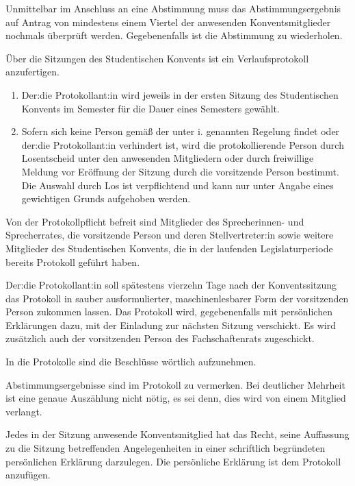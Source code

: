 \documentclass[10pt,a4paper]{scrartcl}
\begin{document}
\begin{contract}
Unmittelbar im Anschluss an eine Abstimmung muss das
Abstimmungsergebnis auf Antrag von mindestens einem Viertel der
anwesenden Konventsmitglieder nochmals überprüft werden.
Gegebenenfalls ist die Abstimmung zu wiederholen.



\label{protokoll}

Über die Sitzungen des Studentischen Konvents ist ein
Verlaufsprotokoll anzufertigen.


\begin{enumerate}
\item
  Der:die Protokollant:in wird jeweils in der ersten Sitzung des
  Studentischen Konvents im Semester für die Dauer eines Semesters
  gewählt.
\item
  Sofern sich keine Person gemäß der unter i. genannten Regelung findet
  oder der:die Protokollant:in verhindert ist, wird die protokollierende
  Person durch Losentscheid unter den anwesenden Mitgliedern oder durch
  freiwillige Meldung vor Eröffnung der Sitzung durch die vorsitzende
  Person bestimmt. Die Auswahl durch Los ist verpflichtend und kann nur
  unter Angabe eines gewichtigen Grunds aufgehoben werden.
\end{enumerate}

Von der Protokollpflicht befreit sind Mitglieder des Sprecherinnen-
und Sprecherrates, die vorsitzende Person und deren Stellvertreter:in
sowie weitere Mitglieder des Studentischen Konvents, die in der
laufenden Legislaturperiode bereits Protokoll geführt haben.

Der:die Protokollant:in soll spätestens vierzehn Tage nach der
Konventssitzung das Protokoll in sauber ausformulierter,
maschinenlesbarer Form der vorsitzenden Person zukommen lassen. Das
Protokoll wird, gegebenenfalls mit persönlichen Erklärungen dazu, mit
der Einladung zur nächsten Sitzung verschickt. Es wird zusätzlich auch
der vorsitzenden Person des Fachschaftenrats zugeschickt.

In die Protokolle sind die Beschlüsse wörtlich aufzunehmen.

Abstimmungsergebnisse sind im Protokoll zu vermerken. Bei deutlicher
Mehrheit ist eine genaue Auszählung nicht nötig, es sei denn, dies
wird von einem Mitglied verlangt.

Jedes in der Sitzung anwesende Konventsmitglied hat das Recht, seine
Auffassung zu die Sitzung betreffenden Angelegenheiten in einer
schriftlich begründeten persönlichen Erklärung darzulegen. Die
persönliche Erklärung ist dem Protokoll anzufügen.


\end{contract}
\end{document}
